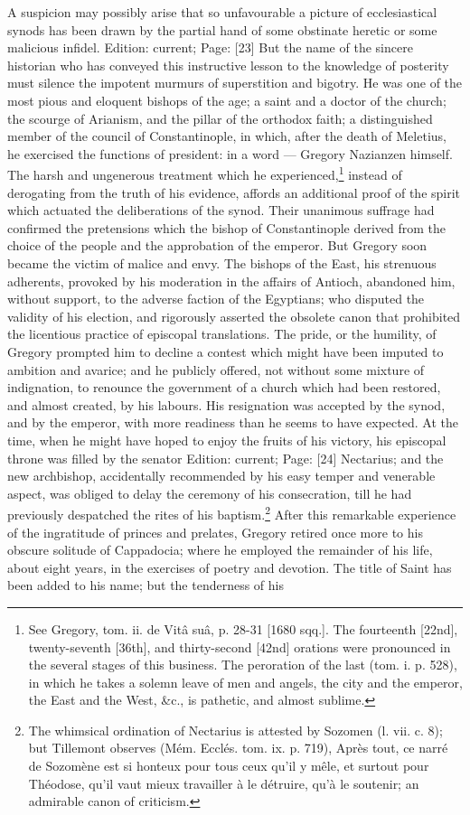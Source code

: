 A suspicion may possibly arise that so unfavourable a picture of ecclesiastical synods has been drawn by the partial hand of some obstinate heretic or some malicious infidel. Edition: current; Page: [23] But the name of the sincere historian who has conveyed this instructive lesson to the knowledge of posterity must silence the impotent murmurs of superstition and bigotry. He was one of the most pious and eloquent bishops of the age; a saint and a doctor of the church; the scourge of Arianism, and the pillar of the orthodox faith; a distinguished member of the council of Constantinople, in which, after the death of Meletius, he exercised the functions of president: in a word \texthebrew{—} Gregory Nazianzen himself. The harsh and ungenerous treatment which he experienced,\footnote{See Gregory, tom. ii. de Vitâ suâ, p. 28-31 [1680 sqq.]. The fourteenth [22nd], twenty-seventh [36th], and thirty-second [42nd] orations were pronounced in the several stages of this business. The peroration of the last (tom. i. p. 528), in which he takes a solemn leave of men and angels, the city and the emperor, the East and the West, \&c., is pathetic, and almost sublime.} instead of derogating from the truth of his evidence, affords an additional proof of the spirit which actuated the deliberations of the synod. Their unanimous suffrage had confirmed the pretensions which the bishop of Constantinople derived from the choice of the people and the approbation of the emperor. But Gregory soon became the victim of malice and envy. The bishops of the East, his strenuous adherents, provoked by his moderation in the affairs of Antioch, abandoned him, without support, to the adverse faction of the Egyptians; who disputed the validity of his election, and rigorously asserted the obsolete canon that prohibited the licentious practice of episcopal translations. The pride, or the humility, of Gregory prompted him to decline a contest which might have been imputed to ambition and avarice; and he publicly offered, not without some mixture of indignation, to renounce the government of a church which had been restored, and almost created, by his labours. His resignation was accepted by the synod, and by the emperor, with more readiness than he seems to have expected. At the time, when he might have hoped to enjoy the fruits of his victory, his episcopal throne was filled by the senator Edition: current; Page: [24] Nectarius; and the new archbishop, accidentally recommended by his easy temper and venerable aspect, was obliged to delay the ceremony of his consecration, till he had previously despatched the rites of his baptism.\footnote{The whimsical ordination of Nectarius is attested by Sozomen (l. vii. c. 8); but Tillemont observes (Mém. Ecclés. tom. ix. p. 719), Après tout, ce narré de Sozomène est si honteux pour tous ceux qu\texthebrew{}’il y mêle, et surtout pour Théodose, qu\texthebrew{}’il vaut mieux travailler à le détruire, qu\texthebrew{}’à le soutenir; an admirable canon of criticism.} After this remarkable experience of the ingratitude of princes and prelates, Gregory retired once more to his obscure solitude of Cappadocia; where he employed the remainder of his life, about eight years, in the exercises of poetry and devotion. The title of Saint has been added to his name; but the tenderness of his 